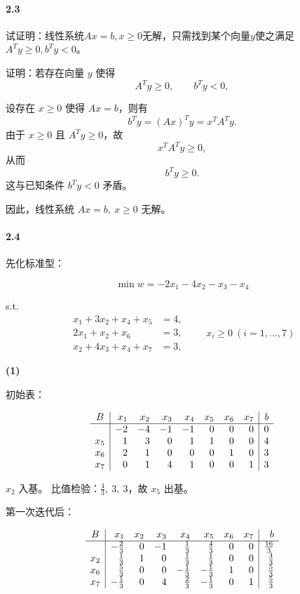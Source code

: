 \documentclass[12pt,a4paper]{article}
\begin{document}
\paragraph{2.3}
试证明：线性系统$Ax=b, x \geq 0$无解，只需找到某个向量$y$使之满足$A^Ty\geq0, b^Ty<0$。

证明：若存在向量 $y$ 使得
\[
A^Ty\ge 0,\qquad b^Ty<0,
\]

设存在 $x\ge 0$ 使得 $Ax=b$，则有
\[
b^Ty=(Ax)^Ty=x^TA^Ty.
\]
由于 $x\ge 0$ 且 $A^Ty\ge 0$，故
\[
x^TA^Ty\ge 0,
\]
从而
\[
b^Ty\ge 0.
\]
这与已知条件 $b^Ty<0$ 矛盾。

因此，线性系统 $Ax=b,\ x\ge 0$ 无解。


\paragraph{2.4}

先化标准型：

\[
\min w=-2x_1-4x_2-x_3-x_4
\]

s.t.
\[
\begin{aligned}
x_1+3x_2+x_4+x_5&=4,\\
2x_1+x_2+x_6&=3,\\
x_2+4x_3+x_4+x_7&=3,
\end{aligned}
\qquad x_i\ge 0\ (i=1,\dots,7)
\]






\textbf{(1)}

初始表：

\[
\begin{array}{c|rrrrrrr|r}
B & x_1&x_2&x_3&x_4&x_5&x_6&x_7&b\\
\hline
  & -2&-4&-1&-1&0&0&0&0\\
x_5&1&3&0&1&1&0&0&4\\
x_6&2&1&0&0&0&1&0&3\\
x_7&0&1&4&1&0&0&1&3
\end{array}
\]

 $x_2$ 入基。
比值检验：$\frac{4}{3},\ 3,\ 3$，故 $x_5$ 出基。

第一次迭代后：

\[
\begin{array}{c|rrrrrrr|r}
B & x_1&x_2&x_3&x_4&x_5&x_6&x_7&b\\
\hline
  & -\frac23&0&-1&\frac13&\frac43&0&0&\frac{16}{3}\\
x_2&\frac13&1&0&\frac13&\frac13&0&0&\frac43\\
x_6&\frac53&0&0&-\frac13&-\frac13&1&0&\frac53\\
x_7&-\frac13&0&4&\frac23&-\frac13&0&1&\frac53
\end{array}
\]
\end{document}

